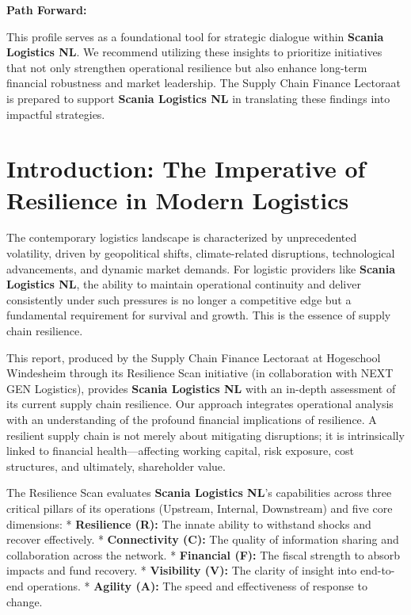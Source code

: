 \documentclass[
  oneside,
  open=any,
  fontsize=11pt]{scrbook}
\begin{document}
\textbf{Path Forward:}

This profile serves as a foundational tool for strategic dialogue within
\textbf{Scania Logistics NL}. We recommend utilizing these insights to
prioritize initiatives that not only strengthen operational resilience
but also enhance long-term financial robustness and market leadership.
The Supply Chain Finance Lectoraat is prepared to support \textbf{Scania
Logistics NL} in translating these findings into impactful strategies.

\newpage

\chapter{Introduction: The Imperative of Resilience in Modern
Logistics}\label{introduction-the-imperative-of-resilience-in-modern-logistics}

The contemporary logistics landscape is characterized by unprecedented
volatility, driven by geopolitical shifts, climate-related disruptions,
technological advancements, and dynamic market demands. For logistic
providers like \textbf{Scania Logistics NL}, the ability to maintain
operational continuity and deliver consistently under such pressures is
no longer a competitive edge but a fundamental requirement for survival
and growth. This is the essence of supply chain resilience.

This report, produced by the Supply Chain Finance Lectoraat at
Hogeschool Windesheim through its Resilience Scan initiative (in
collaboration with NEXT GEN Logistics), provides \textbf{Scania
Logistics NL} with an in-depth assessment of its current supply chain
resilience. Our approach integrates operational analysis with an
understanding of the profound financial implications of resilience. A
resilient supply chain is not merely about mitigating disruptions; it is
intrinsically linked to financial health---affecting working capital,
risk exposure, cost structures, and ultimately, shareholder value.

The Resilience Scan evaluates \textbf{Scania Logistics NL}'s
capabilities across three critical pillars of its operations (Upstream,
Internal, Downstream) and five core dimensions: * \textbf{Resilience
(R):} The innate ability to withstand shocks and recover effectively. *
\textbf{Connectivity (C):} The quality of information sharing and
collaboration across the network. * \textbf{Financial (F):} The fiscal
strength to absorb impacts and fund recovery. * \textbf{Visibility (V):}
The clarity of insight into end-to-end operations. * \textbf{Agility
(A):} The speed and effectiveness of response to change.
\end{document}
